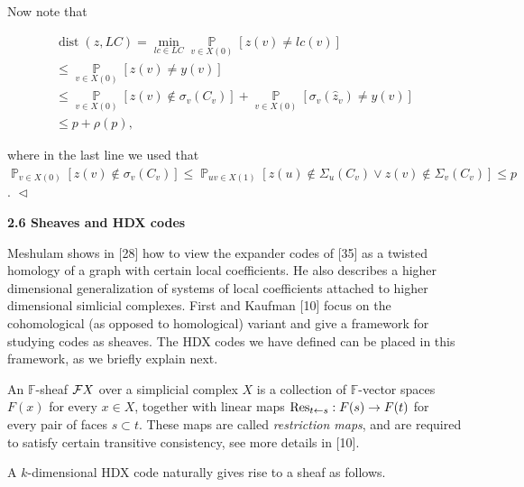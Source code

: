 \documentclass[10pt,a4paper]{article}
\begin{document}
Now note that\par


\[\begin{gathered}
\displaystyle\operatorname{dist}(z,LC) \displaystyle=\min_{lc\in LC}\operatorname*{\mathbb{P}}_{v\in X(0)}\left[z(v)\not=lc(v)\right] \\
\displaystyle\leq\operatorname*{\mathbb{P}}_{v\in X(0)}\left[z(v)\not=y(v)\right] \\
\displaystyle\leq\operatorname*{\mathbb{P}}_{v\in X(0)}\left[z(v)\not\in\sigma_{v}(C_{v})\right]+\operatorname*{\mathbb{P}}_{v\in X(0)}\left[\sigma_{v}(\hat{z}_{v})\not=y(v)\right] \\
\displaystyle\leq p+\rho(p),
\end{gathered}\]


where in the last line we used that $\operatorname*{\mathbb{P}}_{v\in X(0)}\left[z(v)\not\in\sigma_{v}(C_{v})\right]\leq\operatorname*{\mathbb{P}}_{uv\in X(1)}\left[z(u)\not\in\Sigma_{u}(C_{v})\vee z(v)\not\in\Sigma_{v}(C_{v})\right]\leq p$.
$\vartriangleleft$\par






\par\medskip\noindent\textbf{
2.6 Sheaves and HDX codes}\par




Meshulam shows in [28] how to view the expander codes of [35] as a twisted homology of a graph with certain local coefficients. He also describes a higher dimensional generalization of systems of local coefficients attached to higher dimensional simlicial complexes. First and Kaufman [10] focus on the cohomological (as opposed to homological) variant and give a framework for studying codes as sheaves. The HDX codes we have defined can be placed in this framework, as we briefly explain next.\par




An $\mathbb{F}$-sheaf ${\cal F}X$ over a simplicial complex $X$ is a collection of $\mathbb{F}$-vector spaces $F(x)$ for every $x\in X$, together with linear maps ${\rm Res}_{{t}\leftarrow{s}}:F(s)\to F(t)$ for every pair of faces $s\subset t$. These maps are called \emph{restriction maps}, and are required to satisfy certain transitive consistency, see more details in [10].\par




A $k$-dimensional HDX code naturally gives rise to a sheaf as follows.\par
\end{document}
